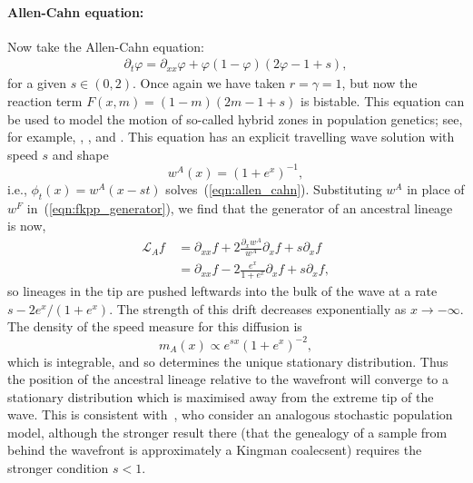 \documentclass[12pt]{article}
\newcommand{\Lgen}{\mathcal{L}}    %
\numberwithin{equation}{section}
\begin{document}
\paragraph{Allen-Cahn equation:}
Now take the Allen-Cahn equation:
\begin{align} \label{eqn:allen_cahn}
    \partial_t\varphi = \partial_{xx}\varphi + \varphi(1-\varphi)(2\varphi-1+s),
\end{align}
for a given $s \in (0,2)$.
Once again we have taken $r=\gamma=1$, but now the reaction term
$F(x,m) = (1-m) (2m-1+s)$ is bistable.
This equation can be used to model the motion of so-called 
hybrid zones in population genetics; see, for example,
\citet{barton:1979}, \citet{gooding:2018}, and \citet{etheridge/gooding/letter:2022}.
This equation has an explicit travelling wave solution with speed $s$
and shape
\[ w^A(x) = (1+e^{x})^{-1} , \]
i.e., $\phi_t(x)=w^A(x-st)$ solves~(\ref{eqn:allen_cahn}).
Substituting $w^A$ in place of $w^F$ in~(\ref{eqn:fkpp_generator}),
we find that the generator of an ancestral lineage is now, 
\begin{align*}
\Lgen_A f
    &=
    \partial_{xx}f
    + 
    2 \frac{\partial_xw^A}{w^A} \partial_xf
    +
    s \partial_x f\\
    \qquad &=
    \partial_{xx}f
    -
    2 \frac{e^x}{1+e^x} \partial_xf 
    + 
    s \partial_xf,
\end{align*}
so lineages in the tip are pushed leftwards into the bulk of the 
wave at a rate $s-2e^x/(1+e^{x})$.
The strength of this drift decreases exponentially as $x\to -\infty$.
The density of the speed measure for this diffusion is
$$
    m_A(x) \propto e^{sx}(1+e^x)^{-2},
$$
which is integrable, and so determines the unique stationary distribution.
Thus the position of the ancestral lineage relative to the wavefront will converge to a stationary 
distribution which is maximised away from the extreme tip of the wave.
This is consistent with~\cite{etheridge/penington:2022}, who consider an analogous
stochastic population model, although the stronger result there (that the genealogy
of a sample from behind the wavefront is approximately a Kingman coalecsent) requires
the stronger condition $s<1$.

\end{document}
